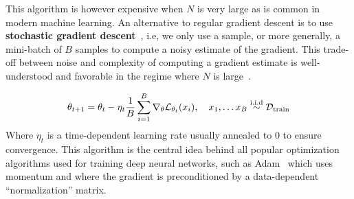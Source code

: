 This algorithm is however expensive when $N$ is very large as is common in
modern machine learning. An alternative to regular gradient descent is to use
\textbf{stochastic gradient descent}~\citep{robbins1951stochastic}, i.e, we only use a sample, or more generally, a mini-batch of $B$ samples to compute a noisy estimate of the gradient. This trade-off between noise and complexity of computing a gradient estimate is well-understood and favorable in the regime where $N$ is large~\citep{tradeoffs2007bottou}.

\begin{equation}
\label{eq:stochastic_gradient_descent}
    \theta_{t+1} = \theta_t - \eta_{t} \frac{1}{B} \sum_{i=1}^B \nabla_\theta {\mathcal{L}}_{\theta_t}(x_i), \quad x_1, \dots x_B \stackrel{\footnotesize{\text{i.i.d}}}{\sim} {\mathcal{D}}_\text{train}
\end{equation}
Where $\eta_t$ is a time-dependent learning rate usually annealed to $0$ to ensure convergence. This algorithm is the central idea behind all popular optimization algorithms used for training deep neural networks, such as Adam~\citep{kingma2014adam} which uses momentum and where the gradient is preconditioned by a data-dependent ``normalization'' matrix.
